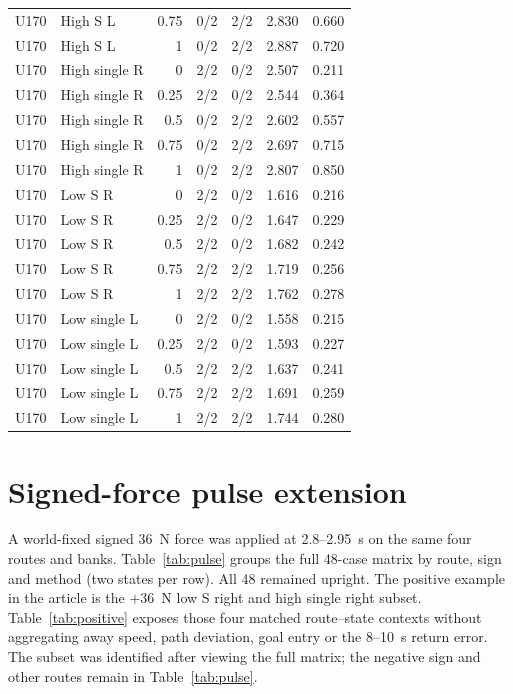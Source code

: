 \documentclass[11pt,a4paper]{article}
\begin{document}
\begin{longtable}{llrrrrr}
U170 & High S L & 0.75 & 0/2 & 2/2 & 2.830 & 0.660 \\
U170 & High S L & 1 & 0/2 & 2/2 & 2.887 & 0.720 \\
U170 & High single R & 0 & 2/2 & 0/2 & 2.507 & 0.211 \\
U170 & High single R & 0.25 & 2/2 & 0/2 & 2.544 & 0.364 \\
U170 & High single R & 0.5 & 0/2 & 2/2 & 2.602 & 0.557 \\
U170 & High single R & 0.75 & 0/2 & 2/2 & 2.697 & 0.715 \\
U170 & High single R & 1 & 0/2 & 2/2 & 2.807 & 0.850 \\
U170 & Low S R & 0 & 2/2 & 0/2 & 1.616 & 0.216 \\
U170 & Low S R & 0.25 & 2/2 & 0/2 & 1.647 & 0.229 \\
U170 & Low S R & 0.5 & 2/2 & 0/2 & 1.682 & 0.242 \\
U170 & Low S R & 0.75 & 2/2 & 2/2 & 1.719 & 0.256 \\
U170 & Low S R & 1 & 2/2 & 2/2 & 1.762 & 0.278 \\
U170 & Low single L & 0 & 2/2 & 0/2 & 1.558 & 0.215 \\
U170 & Low single L & 0.25 & 2/2 & 0/2 & 1.593 & 0.227 \\
U170 & Low single L & 0.5 & 2/2 & 2/2 & 1.637 & 0.241 \\
U170 & Low single L & 0.75 & 2/2 & 2/2 & 1.691 & 0.259 \\
U170 & Low single L & 1 & 2/2 & 2/2 & 1.744 & 0.280 \\
\bottomrule
\end{longtable}

\section{Signed-force pulse extension}
A world-fixed signed 36~N force was applied at 2.8--2.95~s on the same four routes and banks. Table~\ref{tab:pulse} groups the full 48-case matrix by route, sign and method (two states per row). All 48 remained upright. The positive example in the article is the $+36$~N low S right and high single right subset. Table~\ref{tab:positive} exposes those four matched route--state contexts without aggregating away speed, path deviation, goal entry or the 8--10~s return error. The subset was identified after viewing the full matrix; the negative sign and other routes remain in Table~\ref{tab:pulse}.
\end{document}
